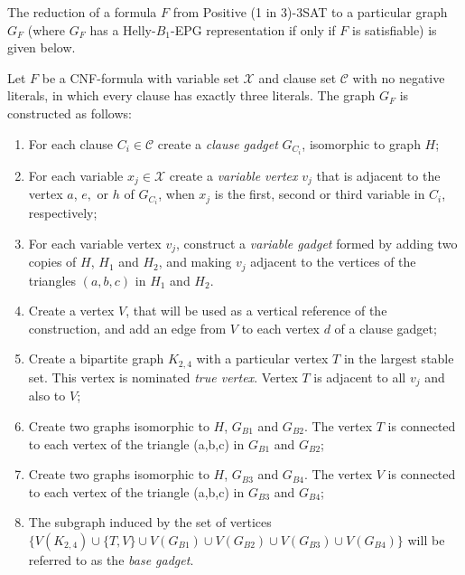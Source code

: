  


The reduction of a formula $F$ from  {\sc Positive (1 in 3)-3SAT}  to a particular graph $G_F$ (where $G_F$ has a Helly-$B_1$-EPG representation if only if $F$ is satisfiable) is given below.

\begin{definition}\label{sec:reducao}
Let $F$ be a CNF-formula with variable set $\mathcal{X}$ and clause set $\mathcal{C}$ with no negative literals, in which every clause has exactly three literals. The graph $G_F$ is constructed as follows:

\begin{enumerate}
\item For each clause $C_i \in \mathcal{C}$ create a  \textit{clause gadget} $G_{C_i}$, isomorphic to  graph $H$;

\item For each variable $x_{j}\in \mathcal{X}$ create a \emph{variable vertex} $v_{j}$ that is adjacent to the vertex $a$, $e,$ or $h$ of $G_{C_i}$, when $x_{j}$ is the first, second or third variable in $C_i$, respectively;

\item For each variable vertex $v_{j}$, construct a \emph{variable gadget} formed by adding two copies of $H$, $H_1$ and $H_2$, and making $v_j$ adjacent to the vertices of the triangles $(a, b, c)$ in  $H_1$ and $H_2$.



\item Create a vertex $V$, that will be used as a vertical reference of the construction, and add an edge from $V$ to each vertex $d$ of a clause gadget;%

\item Create a bipartite graph $K_{2,4}$ with a particular vertex $T$ in the largest stable set. This vertex is nominated \emph{true vertex}. Vertex $T$ is adjacent to all $v_{j}$ and also to $V$;

\item Create two  graphs isomorphic to $H$, $G_{B1}$ and $G_{B2}$. The vertex $T$ is connected to each vertex of the triangle (a,b,c) in $G_{B1}$ and $G_{B2}$;


\item Create two graphs isomorphic  to $H$, $G_{B3}$ and $G_{B4}$. The vertex $V$ is connected to each vertex of the triangle (a,b,c) in $G_{B3}$ and $G_{B4}$;

\item The  subgraph induced by the set of vertices $\{V(K_{2,4}) \cup  \{T, V\} \cup V(G_{B1}) \cup V(G_{B2}) \cup V(G_{B3}) \cup V(G_{B4})\}$ will be referred to as the  \emph{base gadget}. 
\end{enumerate}
\end{definition}


